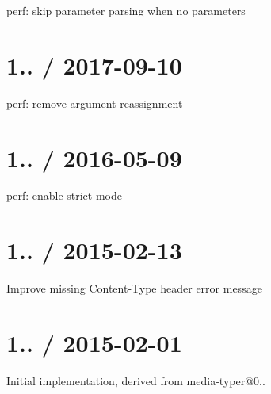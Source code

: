 
\begin{DoxyItemize}
\item perf\+: skip parameter parsing when no parameters
\end{DoxyItemize}

\section*{1.. / 2017-\/09-\/10 }


\begin{DoxyItemize}
\item perf\+: remove argument reassignment
\end{DoxyItemize}

\section*{1.. / 2016-\/05-\/09 }


\begin{DoxyItemize}
\item perf\+: enable strict mode
\end{DoxyItemize}

\section*{1.. / 2015-\/02-\/13 }


\begin{DoxyItemize}
\item Improve missing {\ttfamily Content-\/\+Type} header error message
\end{DoxyItemize}

\section*{1.. / 2015-\/02-\/01 }


\begin{DoxyItemize}
\item Initial implementation, derived from {\ttfamily media-\/typer@0..} 
\end{DoxyItemize}